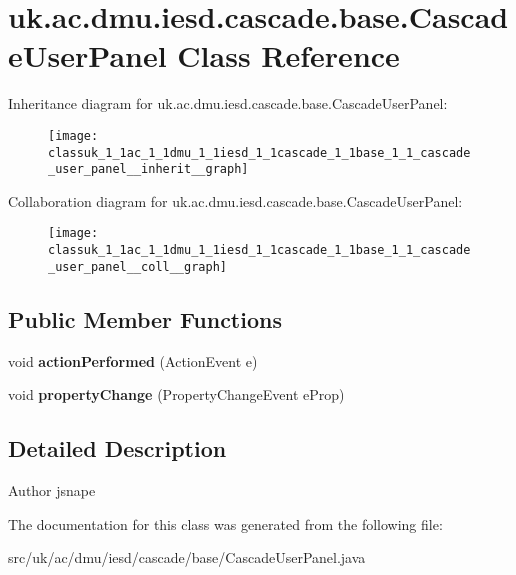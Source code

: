 \hypertarget{classuk_1_1ac_1_1dmu_1_1iesd_1_1cascade_1_1base_1_1_cascade_user_panel}{\section{uk.\-ac.\-dmu.\-iesd.\-cascade.\-base.\-Cascade\-User\-Panel Class Reference}
\label{classuk_1_1ac_1_1dmu_1_1iesd_1_1cascade_1_1base_1_1_cascade_user_panel}
}


Inheritance diagram for uk.\-ac.\-dmu.\-iesd.\-cascade.\-base.\-Cascade\-User\-Panel\-:\nopagebreak
\begin{figure}[H]
\begin{center}
\leavevmode
\texttt{[image: classuk\_1\_1ac\_1\_1dmu\_1\_1iesd\_1\_1cascade\_1\_1base\_1\_1\_cascade\_user\_panel\_\_inherit\_\_graph]}
\end{center}
\end{figure}


Collaboration diagram for uk.\-ac.\-dmu.\-iesd.\-cascade.\-base.\-Cascade\-User\-Panel\-:\nopagebreak
\begin{figure}[H]
\begin{center}
\leavevmode
\texttt{[image: classuk\_1\_1ac\_1\_1dmu\_1\_1iesd\_1\_1cascade\_1\_1base\_1\_1\_cascade\_user\_panel\_\_coll\_\_graph]}
\end{center}
\end{figure}
\subsection*{Public Member Functions}
\begin{DoxyCompactItemize}
\item 
\hypertarget{classuk_1_1ac_1_1dmu_1_1iesd_1_1cascade_1_1base_1_1_cascade_user_panel_a282c1680d6c49bae978b48b3dfed0b24}{void {\bfseries action\-Performed} (Action\-Event e)}\label{classuk_1_1ac_1_1dmu_1_1iesd_1_1cascade_1_1base_1_1_cascade_user_panel_a282c1680d6c49bae978b48b3dfed0b24}

\item 
\hypertarget{classuk_1_1ac_1_1dmu_1_1iesd_1_1cascade_1_1base_1_1_cascade_user_panel_addf7bdfdad1ed14a6588c753bd235696}{void {\bfseries property\-Change} (Property\-Change\-Event e\-Prop)}\label{classuk_1_1ac_1_1dmu_1_1iesd_1_1cascade_1_1base_1_1_cascade_user_panel_addf7bdfdad1ed14a6588c753bd235696}

\end{DoxyCompactItemize}


\subsection{Detailed Description}
\begin{DoxyAuthor}{Author}
jsnape 
\end{DoxyAuthor}


The documentation for this class was generated from the following file\-:\begin{DoxyCompactItemize}
\item 
src/uk/ac/dmu/iesd/cascade/base/Cascade\-User\-Panel.\-java\end{DoxyCompactItemize}
